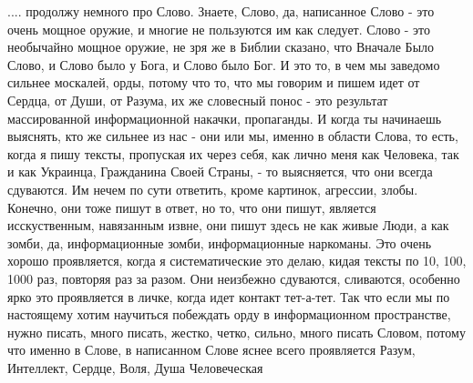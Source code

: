  
 
 
 
 

.... продолжу немного про Слово. Знаете, Слово, да, написанное Слово - это
очень мощное оружие, и многие не пользуются им как следует. Слово - это
необычайно мощное оружие, не зря же в Библии сказано, что Вначале Было Слово, и
Слово было у Бога, и Слово было Бог. И это то, в чем мы заведомо сильнее
москалей, орды, потому что то, что мы говорим и пишем идет от Сердца, от Души,
от Разума, их же словесный понос - это результат массированной информационной
накачки, пропаганды. И когда ты начинаешь выяснять, кто же сильнее из нас - они
или мы, именно в области Слова, то есть, когда я пишу тексты, пропуская их
через себя, как лично меня как Человека, так и как Украинца, Гражданина Своей
Страны, - то выясняется, что они всегда сдуваются. Им нечем по сути ответить,
кроме картинок, агрессии, злобы. Конечно, они тоже пишут в ответ, но то, что
они пишут, является исскуственным, навязанным извне, они пишут здесь не как
живые Люди, а как зомби, да, информационные зомби, информационные наркоманы.
Это очень хорошо проявляется, когда я систематические это делаю, кидая тексты
по 10, 100, 1000 раз, повторяя раз за разом. Они неизбежно сдуваются,
сливаются, особенно ярко это проявляется в личке, когда идет контакт тет-а-тет.
Так что если мы по настоящему хотим научиться побеждать орду в информационном
пространстве, нужно писать, много писать, жестко, четко, сильно, много писать
Словом, потому что именно в Слове, в написанном Слове яснее всего проявляется
Разум, Интеллект, Сердце, Воля, Душа Человеческая

